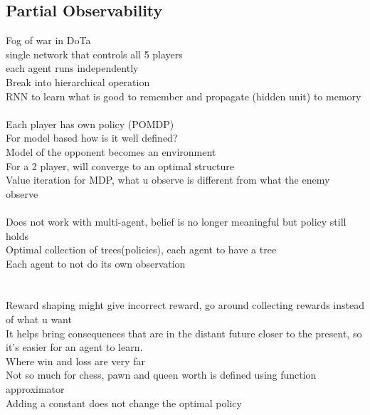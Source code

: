 \documentclass[11pt]{article}
\begin{document}
{\subsection*{Partial Observability}
Fog of war in DoTa\\
single network that controls all 5 players\\
each agent runs independently
\\
Break into hierarchical operation\\
RNN to learn what is good to remember and propagate (hidden unit) to memory\\
\\
Each player has own policy (POMDP)
\\
For model based how is it well defined?\\
Model of the opponent becomes an environment\\
For a 2 player, will converge to an optimal structure\\
Value iteration for MDP, what u observe is different from what the enemy observe\\
\\
Does not work with multi-agent, belief is no longer meaningful but policy still holds\\
Optimal collection of trees(policies), each agent to have a tree\\
Each agent to not do its own observation\\
\\\\
Reward shaping might give incorrect reward, go around collecting rewards instead of what u want
\\
 It helps bring consequences that are in the distant future closer to the present, so it's easier for an agent to learn.
 \\
Where win and loss are very far\\
Not so much for chess, pawn and queen worth is defined using function approximator\\
Adding a constant does not change the optimal policy\\
\\
}
\end{document}
